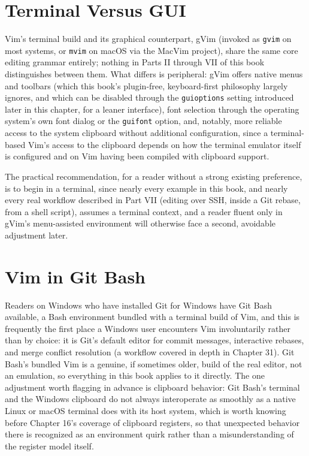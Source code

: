 \section{Terminal Versus GUI}

Vim's terminal build and its graphical counterpart, gVim (invoked as \texttt{gvim} on most systems, or \texttt{mvim} on macOS via the MacVim project), share the same core editing grammar entirely; nothing in Parts II through VII of this book distinguishes between them. What differs is peripheral: gVim offers native menus and toolbars (which this book's plugin-free, keyboard-first philosophy largely ignores, and which can be disabled through the \texttt{guioptions} setting introduced later in this chapter, for a leaner interface), font selection through the operating system's own font dialog or the \texttt{guifont} option, and, notably, more reliable access to the system clipboard without additional configuration, since a terminal-based Vim's access to the clipboard depends on how the terminal emulator itself is configured and on Vim having been compiled with clipboard support.

The practical recommendation, for a reader without a strong existing preference, is to begin in a terminal, since nearly every example in this book, and nearly every real workflow described in Part VII (editing over SSH, inside a Git rebase, from a shell script), assumes a terminal context, and a reader fluent only in gVim's menu-assisted environment will otherwise face a second, avoidable adjustment later.

\section{Vim in Git Bash}

Readers on Windows who have installed Git for Windows have Git Bash available, a Bash environment bundled with a terminal build of Vim, and this is frequently the first place a Windows user encounters Vim involuntarily rather than by choice: it is Git's default editor for commit messages, interactive rebases, and merge conflict resolution (a workflow covered in depth in Chapter 31). Git Bash's bundled Vim is a genuine, if sometimes older, build of the real editor, not an emulation, so everything in this book applies to it directly. The one adjustment worth flagging in advance is clipboard behavior: Git Bash's terminal and the Windows clipboard do not always interoperate as smoothly as a native Linux or macOS terminal does with its host system, which is worth knowing before Chapter 16's coverage of clipboard registers, so that unexpected behavior there is recognized as an environment quirk rather than a misunderstanding of the register model itself.

